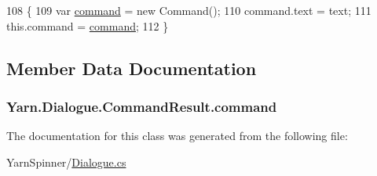 \begin{DoxyCode}
108                                                \{
109                 var \hyperlink{a00041_a420ca0984d6e5c33bb761654305c592e}{command} = \textcolor{keyword}{new} Command();
110                 command.text = text;
111                 this.command = \hyperlink{a00041_a420ca0984d6e5c33bb761654305c592e}{command};
112             \}
\end{DoxyCode}


\subsection{Member Data Documentation}
\hypertarget{a00041_a420ca0984d6e5c33bb761654305c592e}{
\subsubsection[{command}]{ Yarn.\-Dialogue.\-Command\-Result.\-command}}\label{a00041_a420ca0984d6e5c33bb761654305c592e}


The documentation for this class was generated from the following file\-:\begin{DoxyCompactItemize}
\item 
Yarn\-Spinner/\hyperlink{a00138}{Dialogue.\-cs}\end{DoxyCompactItemize}
